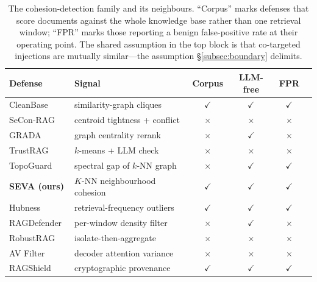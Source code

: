 \documentclass[10pt,journal,compsoc]{IEEEtran}
\begin{document}
\begin{table}[t]
\centering
\caption{The cohesion-detection family and its neighbours. ``Corpus'' marks defenses that score
documents against the whole knowledge base rather than one retrieval window; ``FPR'' marks those
reporting a benign false-positive rate at their operating point. The shared assumption in the
top block is that co-targeted injections are mutually similar---the assumption
\S\ref{subsec:boundary} delimits.}
\label{tab:family}
\setlength{\tabcolsep}{3.5pt}
\begin{tabular}{llcccc}
\toprule
Defense & Signal & Corpus & LLM-free & FPR \\
\midrule
CleanBase~\cite{cleanbase}   & similarity-graph cliques & $\checkmark$ & $\checkmark$ & $\checkmark$ \\
SeCon-RAG~\cite{secon}       & centroid tightness + conflict & $\times$ & $\times$ & $\times$ \\
GRADA~\cite{grada}           & graph centrality rerank & $\times$ & $\checkmark$ & $\times$ \\
TrustRAG~\cite{trustrag}     & $k$-means + LLM check & $\times$ & $\times$ & $\times$ \\
TopoGuard~\cite{topoguard}   & spectral gap of $k$-NN graph & $\times$ & $\checkmark$ & $\checkmark$ \\
\textbf{SEVA (ours)}         & $K$-NN neighbourhood cohesion & $\checkmark$ & $\checkmark$ & $\checkmark$ \\
\midrule
Hubness~\cite{hubness}       & retrieval-frequency outliers & $\checkmark$ & $\checkmark$ & $\checkmark$ \\
RAGDefender~\cite{ragdefender}& per-window density filter & $\times$ & $\checkmark$ & $\times$ \\
RobustRAG~\cite{robustrag}   & isolate-then-aggregate & $\times$ & $\times$ & $\times$ \\
AV Filter~\cite{avfilter}    & decoder attention variance & $\times$ & $\times$ & $\times$ \\
RAGShield~\cite{ragshield}   & cryptographic provenance & $\checkmark$ & $\checkmark$ & $\checkmark$ \\
\bottomrule
\end{tabular}
\end{table}
\end{document}
